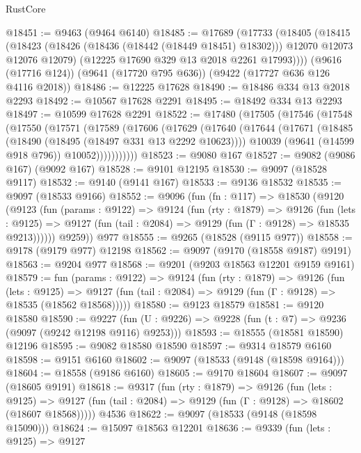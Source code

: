 \begin{lexlean}{RustCore}
\begin{coremodule}
@18451 := @9463 (@9464 @6140)
@18485 := @17689
    (@17733
      (@18405
        (@18415
          (@18423 (@18426 (@18436 (@18442 (@18449 @18451) @18302))) @12070 @12073 @12076 @12079)
          (@12225 @17690 @329 @13 @2018 @2261 @17993))))
    (@9616 (@17716 @124))
    (@9641 (@17720 @795 @636))
    (@9422 (@17727 @636 @126 @4116 @2018))
@18486 := @12225 @17628
@18490 := @18486 @334 @13 @2018 @2293
@18492 := @10567 @17628 @2291
@18495 := @18492 @334 @13 @2293
@18497 := @10599 @17628 @2291
@18522 := @17480
    (@17505
      (@17546
        (@17548
          (@17550
            (@17571
              (@17589
                (@17606
                  (@17629
                    (@17640
                      (@17644
                        (@17671
                          (@18485 (@18490 (@18495 (@18497 @331 @13 @2292 @10623))))
                          @10039
                          (@9641 (@14599 @918 @796))
                          @10052)))))))))))
@18523 := @9080 @167
@18527 := @9082 (@9086 @167) (@9092 @167)
@18528 := @9101 @12195
@18530 := @9097 (@18528 @9117)
@18532 := @9140 (@9141 @167)
@18533 := @9136 @18532
@18535 := @9097 (@18533 @9166)
@18552 := @9096
    (fun (fn : @117) =>
    @18530
      (@9120
        (@9123
          (fun (params : @9122) =>
          @9124
            (fun (rty : @1879) =>
            @9126
              (fun (lets : @9125) =>
              @9127 (fun (tail : @2084) => @9129 (fun (Γ : @9128) => @18535 @9213))))))
        @9259))
    @977
@18555 := @9265 (@18528 (@9115 @977))
@18558 := @9178 (@9179 @977) @12198
@18562 := @9097 (@9170 (@18558 @9187) @9191)
@18563 := @9204 @977
@18568 := @9201 (@9203 @18563 @12201 @9159 @9161)
@18579 := fun (params : @9122) =>
  @9124
    (fun (rty : @1879) =>
    @9126
      (fun (lets : @9125) =>
      @9127 (fun (tail : @2084) => @9129 (fun (Γ : @9128) => @18535 (@18562 @18568)))))
@18580 := @9123 @18579
@18581 := @9120 @18580
@18590 := @9227
    (fun (U : @9226) => @9228 (fun (t : @7) => @9236 (@9097 (@9242 @12198 @9116) @9253)))
@18593 := @18555 (@18581 @18590) @12196
@18595 := @9082 @18580 @18590
@18597 := @9314 @18579 @6160
@18598 := @9151 @6160
@18602 := @9097 (@18533 (@9148 (@18598 @9164)))
@18604 := @18558 (@9186 @6160)
@18605 := @9170 @18604
@18607 := @9097 (@18605 @9191)
@18618 := @9317
    (fun (rty : @1879) =>
    @9126
      (fun (lets : @9125) =>
      @9127 (fun (tail : @2084) => @9129 (fun (Γ : @9128) => @18602 (@18607 @18568)))))
    @4536
@18622 := @9097 (@18533 (@9148 (@18598 @15090)))
@18624 := @15097 @18563 @12201
@18636 := @9339
    (fun (lets : @9125) =>
    @9127

\end{coremodule}
\end{lexlean}
